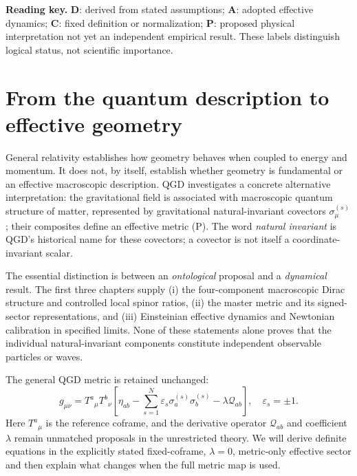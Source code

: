 \documentclass[11pt,a4paper]{article}
\begin{document}
\noindent\textbf{Reading key.} \textbf{D}: derived from stated assumptions;
\textbf{A}: adopted effective dynamics; \textbf{C}: fixed definition or
normalization; \textbf{P}: proposed physical interpretation not yet an
independent empirical result. These labels distinguish logical status,
not scientific importance.

\section{From the quantum description to effective geometry}
\label{sec:motivation}
General relativity establishes how geometry behaves when coupled to
energy and momentum. It does not, by itself, establish whether geometry
is fundamental or an effective macroscopic description. QGD investigates
a concrete alternative interpretation: the gravitational field is
associated with macroscopic quantum structure of matter, represented by
gravitational natural-invariant covectors $\sigma_\mu^{(s)}$; their
composites define an effective metric (P). The word \emph{natural
invariant} is QGD's historical name for these covectors; a covector is
not itself a coordinate-invariant scalar.

The essential distinction is between an \emph{ontological} proposal and a
\emph{dynamical} result. The first three chapters supply (i) the
four-component macroscopic Dirac structure and controlled local spinor
ratios, (ii) the master metric and its signed-sector representations,
and (iii) Einsteinian effective dynamics and Newtonian calibration in
specified limits. None of these statements alone proves that the
individual natural-invariant components constitute independent
observable particles or waves.

The general QGD metric is retained unchanged:
\begin{equation}\label{eq:master}
\boxed{g_{\mu\nu}=T^a{}_{\mu}T^b{}_{\nu}
\left[\eta_{ab}-\sum_{s=1}^{N}\varepsilon_s
\sigma_a^{(s)}\sigma_b^{(s)}-\lambda\mathcal Q_{ab}\right],
\quad \varepsilon_s=\pm1.}
\end{equation}
Here $T^a{}_{\mu}$ is the reference coframe, and the derivative
operator $\mathcal Q_{ab}$ and coefficient $\lambda$ remain
unmatched proposals in the unrestricted theory. We will derive definite
equations in the explicitly stated fixed-coframe, $\lambda=0$,
metric-only effective sector and then explain what changes when the
full metric map is used.
\end{document}
